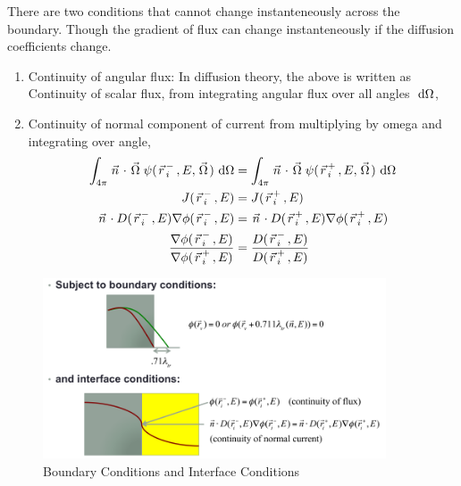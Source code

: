 \documentclass{school-22.211-notes}
\begin{document}
\clearpage
{}
There are two conditions that cannot change instanteneously across the boundary. Though the gradient of flux can change instanteneously if the diffusion coefficients change. 
\begin{enumerate}
\item Continuity of angular flux: 
  In diffusion theory, the above is written as Continuity of scalar flux, from integrating angular flux over all angles $\mbox{ }\mathrm{d} \Omega$, 
\item Continuity of normal component of current from multiplying by omega and integrating over angle, 
  \begin{align}
    \int_{4\pi} \left.\vec{n}\right. \cdot \left.\vec{\Omega}\right. \psi(\left.\vec{r}\right._i^-, E, \left.\vec{\Omega}\right.) \mbox{ }\mathrm{d} \Omega &= \int_{4\pi} \left.\vec{n}\right. \cdot \left.\vec{\Omega}\right. \psi(\left.\vec{r}\right._i^+, E, \left.\vec{\Omega}\right.) \mbox{ }\mathrm{d} \Omega \\
    J(\left.\vec{r}\right._i^-, E) &= J(\left.\vec{r}\right._i^+, E) \\
    \left.\vec{n}\right. \cdot D(\left.\vec{r}\right._i^-, E) \nabla \phi(\left.\vec{r}\right._i^-, E) &= \left.\vec{n}\right. \cdot D(\left.\vec{r}\right._i^+, E) \nabla \phi(\left.\vec{r}\right._i^+, E) \\
    \frac{\nabla \phi(\left.\vec{r}\right._i^-, E)}{\nabla \phi(\left.\vec{r}\right._i^+, E)} &= \frac{D(\left.\vec{r}\right._i^-, E)}{D(\left.\vec{r}\right._i^+, E)} 
  \end{align}
\end{enumerate}


\begin{figure}
  \centering
  \includegraphics[width=4in]{images/dfs/boundary-interface.png}
  \caption{Boundary Conditions and Interface Conditions} \label{boundary-interface}
\end{figure}
\end{document}
